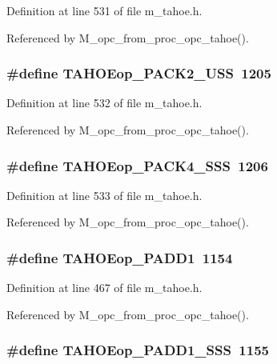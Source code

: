 Definition at line 531 of file m\_\-tahoe.h.

Referenced by M\_\-opc\_\-from\_\-proc\_\-opc\_\-tahoe().
\subsubsection{\setlength{\rightskip}{0pt plus 5cm}\#define TAHOEop\_\-PACK2\_\-USS~1205}\label{m__tahoe_8h_08e64f24770c0739525897c62910a721}




Definition at line 532 of file m\_\-tahoe.h.

Referenced by M\_\-opc\_\-from\_\-proc\_\-opc\_\-tahoe().
\subsubsection{\setlength{\rightskip}{0pt plus 5cm}\#define TAHOEop\_\-PACK4\_\-SSS~1206}\label{m__tahoe_8h_201b95e0f43446c0deb15859223400cf}




Definition at line 533 of file m\_\-tahoe.h.

Referenced by M\_\-opc\_\-from\_\-proc\_\-opc\_\-tahoe().
\subsubsection{\setlength{\rightskip}{0pt plus 5cm}\#define TAHOEop\_\-PADD1~1154}\label{m__tahoe_8h_d527616bb7840cf777666395d26316e1}




Definition at line 467 of file m\_\-tahoe.h.

Referenced by M\_\-opc\_\-from\_\-proc\_\-opc\_\-tahoe().
\subsubsection{\setlength{\rightskip}{0pt plus 5cm}\#define TAHOEop\_\-PADD1\_\-SSS~1155}\label{m__tahoe_8h_f335a0dbf47ad7a2d0661edf69c035ee}





